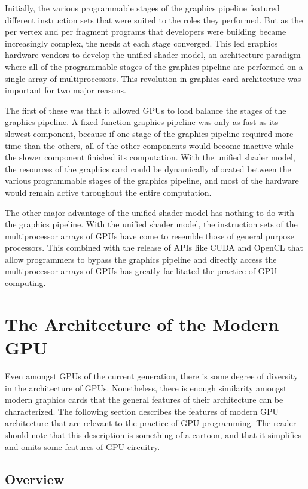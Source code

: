 \documentclass[12pt,twoside]{reedthesis}
\begin{document}
Initially, the various programmable stages of the graphics pipeline featured different instruction sets that were suited to the roles they performed. But as the per vertex and per fragment programs that developers were building became increasingly complex, the needs at each stage converged. This led graphics hardware vendors to develop the unified shader model, an architecture paradigm where all of the programmable stages of the graphics pipeline are performed on a single array of multiprocessors. This revolution in graphics card architecture was important for two major reasons.

The first of these was that it allowed GPUs to load balance the stages of the graphics pipeline. A fixed-function graphics pipeline was only as fast as its slowest component, because if one stage of the graphics pipeline required more time than the others, all of the other components would become inactive while the slower component finished its computation. With the unified shader model, the resources of the graphics card could be dynamically allocated between the various programmable stages of the graphics pipeline, and most of the hardware would remain active throughout the entire computation.

The other major advantage of the unified shader model has nothing to do with the graphics pipeline. With the unified shader model, the instruction sets of the multiprocessor arrays of GPUs have come to resemble those of general purpose processors. This combined with the release of APIs like CUDA and OpenCL that allow programmers to bypass the graphics pipeline and directly access the multiprocessor arrays of GPUs has greatly facilitated the practice of GPU computing.

\section{The Architecture of the Modern GPU}

Even amongst GPUs of the current generation, there is some degree of diversity in the architecture of GPUs. Nonetheless, there is enough similarity amongst modern graphics cards that the general features of their architecture can be characterized. The following section describes the features of modern GPU architecture that are relevant to the practice of GPU programming. The reader should note that this description is something of a cartoon, and that it simplifies and omits some features of GPU circuitry.

\subsection{Overview}
\end{document}
